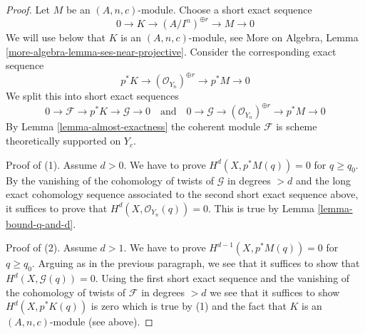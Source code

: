 \documentclass[10pt,a4paper]{amsart}
\theoremstyle{plain}
\theoremstyle{definition}
\theoremstyle{remark}
\numberwithin{equation}{subsection}
\begin{document}
\begin{proof}
Let $M$ be an $(A, n, c)$-module. Choose a short exact sequence
$$
0 \to K \to (A/I^n)^{\oplus r} \to M \to 0
$$
We will use below that $K$ is an $(A, n, c)$-module, see More on Algebra,
Lemma \ref{more-algebra-lemma-ses-near-projective}.
Consider the corresponding exact sequence
$$
p^*K \to (\mathcal{O}_{Y_n})^{\oplus r} \to p^*M \to 0
$$
We split this into short exact sequences
$$
0 \to \mathcal{F} \to p^*K \to \mathcal{G} \to 0
\quad\text{and}\quad
0 \to \mathcal{G} \to (\mathcal{O}_{Y_n})^{\oplus r} \to p^*M \to 0
$$
By Lemma \ref{lemma-almost-exactness} the coherent module $\mathcal{F}$
is scheme theoretically supported on $Y_c$.

\medskip\noindent
Proof of (1). Assume $d > 0$. We have to prove
$H^d(X, p^*M(q)) = 0$ for $q \geq q_0$.
By the vanishing of the cohomology of twists of $\mathcal{G}$ in degrees $> d$
and the long exact cohomology sequence associated to the second
short exact sequence above, it suffices to prove that
$H^d(X, \mathcal{O}_{Y_n}(q)) = 0$.
This is true by Lemma \ref{lemma-bound-q-and-d}.

\medskip\noindent
Proof of (2). Assume $d > 1$. We have to prove
$H^{d - 1}(X, p^*M(q)) = 0$ for $q \geq q_0$.
Arguing as in the previous paragraph, we see that it suffices
to show that $H^d(X, \mathcal{G}(q)) = 0$. Using the first
short exact sequence and the vanishing of the cohomology
of twists of $\mathcal{F}$ in degrees $> d$ we see that it suffices
to show $H^d(X, p^*K(q))$ is zero which is
true by (1) and the fact that $K$ is an $(A, n, c)$-module (see above).


\end{proof}
\end{document}
